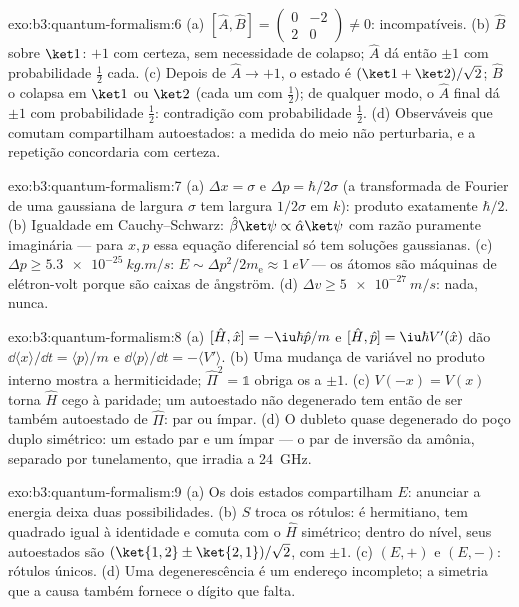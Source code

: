 \begin{solution}{exo:b3:quantum-formalism:6}
(a) $[\hat A, \hat B] = \begin{pmatrix}0 & -2\\ 2 & 0\end{pmatrix}
\neq 0$: incompatíveis. (b) $\hat B$ sobre $\ket1$: $+1$ com
certeza, sem necessidade de colapso; $\hat A$ dá então $\pm1$ com
probabilidade $\tfrac12$ cada. (c) Depois de $\hat A \to +1$, o estado
é $(\ket1 + \ket2)/\sqrt2$; $\hat B$ o colapsa em $\ket1$ ou
$\ket2$ (cada um com $\tfrac12$); de qualquer modo, o $\hat A$ final dá
$\pm1$ com probabilidade $\tfrac12$: contradição com probabilidade
$\tfrac12$. (d) Observáveis que comutam compartilham autoestados: a
medida do meio não perturbaria, e a repetição concordaria com certeza.
\end{solution}

\begin{solution}{exo:b3:quantum-formalism:7}
(a) $\Delta x = \sigma$ e $\Delta p = \hbar/2\sigma$ (a transformada de
Fourier de uma gaussiana de largura $\sigma$ tem largura $1/2\sigma$ em
$k$): produto exatamente $\hbar/2$. (b) Igualdade em Cauchy--Schwarz:
$\hat\beta\ket\psi \propto \hat\alpha\ket\psi$ com razão puramente
imaginária --- para $x, p$ essa equação diferencial só tem soluções
gaussianas. (c) $\Delta p \ge \qty{5.3e-25}{kg.m/s}$: $E \sim
\Delta p^2/2m_{\text{e}} \approx \qty{1}{eV}$ --- os átomos são
máquinas de elétron-volt porque são caixas de ångström. (d)
$\Delta v \ge \qty{5e-27}{m/s}$: nada, nunca.
\end{solution}

\begin{solution}{exo:b3:quantum-formalism:8}
(a) $[\hat H, \hat x] = -\iu\hbar\hat p/m$ e $[\hat H, \hat p] =
\iu\hbar V'(\hat x)$ dão $\dd\langle x\rangle/\dd t = \langle
p\rangle/m$ e $\dd\langle p\rangle/\dd t = -\langle V'\rangle$. (b)
Uma mudança de variável no produto interno mostra a hermiticidade;
$\hat\Pi^2 = \mathbb 1$ obriga os  a $\pm1$. (c) $V(-x) =
V(x)$ torna $\hat H$ cego à paridade; um autoestado não degenerado tem
então de ser também autoestado de $\hat\Pi$: par ou ímpar. (d) O
dubleto quase degenerado do poço duplo simétrico: um estado par e um
ímpar --- o par de inversão da amônia, separado por tunelamento, que
irradia a \qty{24}{GHz}.
\end{solution}

\begin{solution}{exo:b3:quantum-formalism:9}
(a) Os dois estados compartilham $E$: anunciar a energia deixa duas
possibilidades. (b) $\hat S$ troca os rótulos: é hermitiano, tem
quadrado igual à identidade e comuta com o $\hat H$ simétrico; dentro
do nível, seus autoestados são $(\ket{1,2} \pm \ket{2,1})/\sqrt2$, com
 $\pm1$. (c) $(E, +)$ e $(E, -)$: rótulos únicos. (d) Uma
degenerescência é um endereço incompleto; a simetria que a causa também
fornece o dígito que falta.
\end{solution}

